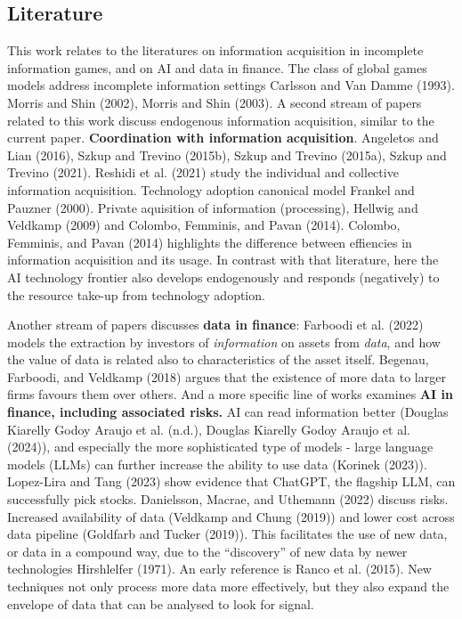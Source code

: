 \documentclass[
]{article}
\theoremstyle{plain}
\theoremstyle{definition}
\theoremstyle{remark}
\begin{document}
\subsection{Literature}\label{literature}

This work relates to the literatures on information acquisition in
incomplete information games, and on AI and data in finance. The class
of global games models address incomplete information settings Carlsson
and Van Damme (1993). Morris and Shin (2002), Morris and Shin (2003). A
second stream of papers related to this work discuss endogenous
information acquisition, similar to the current paper.
\textbf{Coordination with information acquisition}. Angeletos and Lian
(2016), Szkup and Trevino (2015b), Szkup and Trevino (2015a), Szkup and
Trevino (2021). Reshidi et al. (2021) study the individual and
collective information acquisition. Technology adoption canonical model
Frankel and Pauzner (2000). Private aquisition of information
(processing), Hellwig and Veldkamp (2009) and Colombo, Femminis, and
Pavan (2014). Colombo, Femminis, and Pavan (2014) highlights the
difference between effiencies in information acquisition and its usage.
In contrast with that literature, here the AI technology frontier also
develops endogenously and responds (negatively) to the resource take-up
from technology adoption.

Another stream of papers discusses \textbf{data in finance}: Farboodi et
al. (2022) models the extraction by investors of \emph{information} on
assets from \emph{data}, and how the value of data is related also to
characteristics of the asset itself. Begenau, Farboodi, and Veldkamp
(2018) argues that the existence of more data to larger firms favours
them over others. And a more specific line of works examines \textbf{AI
in finance, including associated risks.} AI can read information better
(Douglas Kiarelly Godoy Araujo et al. (n.d.), Douglas Kiarelly Godoy
Araujo et al. (2024)), and especially the more sophisticated type of
models - large language models (LLMs) can further increase the ability
to use data (Korinek (2023)). Lopez-Lira and Tang (2023) show evidence
that ChatGPT, the flagship LLM, can successfully pick stocks.
Danielsson, Macrae, and Uthemann (2022) discuss risks. Increased
availability of data (Veldkamp and Chung (2019)) and lower cost across
data pipeline (Goldfarb and Tucker (2019)). This facilitates the use of
new data, or data in a compound way, due to the ``discovery'' of new
data by newer technologies Hirshlelfer (1971). An early reference is
Ranco et al. (2015). New techniques not only process more data more
effectively, but they also expand the envelope of data that can be
analysed to look for signal.
\end{document}
